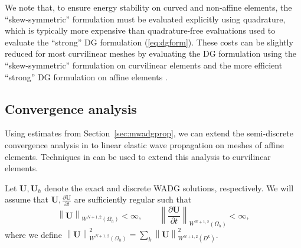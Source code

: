 \documentclass{siamart0216}
\newcommand{\pd}[2]{\frac{\partial#1}{\partial#2}}
\newcommand{\nor}[1]{\left\| #1 \right\|}
\newcommand{\LRp}[1]{\left( #1 \right)}
\newcommand{\Oh}{{\Omega_h}}
\newcommand*\diff[1]{\mathop{}\!{\mathrm{d}#1}}
\begin{document}
We note that, to ensure energy stability on curved and non-affine elements, the ``skew-symmetric'' formulation must be evaluated explicitly using quadrature, which is typically more expensive than quadrature-free evaluations used to evaluate the ``strong'' DG formulation (\ref{eq:dgform}).  These costs can be slightly reduced for most curvilinear meshes by evaluating the DG formulation using the ``skew-symmetric'' formulation on curvilinear elements and the more efficient ``strong'' DG formulation on affine elements \cite{chan2016weight2}.  

\subsection{Convergence analysis}

Using estimates from Section~\ref{sec:mwadgprop}, we can extend the semi-discrete convergence analysis in \cite{houston2002discontinuous,warburton2013low,chan2016weight1} to linear elastic wave propagation on meshes of affine elements.  Techniques in \cite{warburton2013low} can be used to extend this analysis to curvilinear elements.  

Let $\bm{U},\bm{U}_h$ denote the exact and discrete WADG solutions, respectively.  We will assume that $\bm{U},\pd{\bm{U}}{t}$ are sufficiently regular such that
\[
\nor{\bm{U}}_{W^{N+1,2}\LRp{\Oh}} < \infty, \qquad \nor{\pd{\bm{U}}{t}}_{W^{N+1,2}\LRp{\Oh}} < \infty,
\]
where we define $\nor{\bm{U}}_{W^{N+1,2}\LRp{\Oh}}^2 = \sum_k \nor{\bm{U}}_{W^{N+1,2}\LRp{D^k}}^2$.

\end{document}

